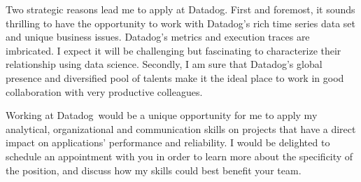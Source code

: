 \documentclass[11pt, a4paper]{awesome-cv}
\newcommand{\company}{Datadog}
\begin{document}
\begin{cvletter}
Two strategic reasons lead me to apply at \company.    
First and foremost, it sounds thrilling to have the opportunity to work with \company's rich time series data set and unique business issues. \company's metrics and execution traces are imbricated. I expect it will be challenging but fascinating to characterize their relationship using data science.  
Secondly, I am sure that \company's global presence and diversified pool of talents make it the ideal place to work in good collaboration with very productive colleagues. 

Working at \company~would be a unique opportunity for me to apply my analytical, organizational and communication skills on projects that have a direct impact on applications' performance and reliability. 
I would be delighted to schedule an appointment with you in order to learn more about the specificity of the position, and discuss how my skills could best benefit your team. 
\end{cvletter}


\makeletterclosing
\end{document}
